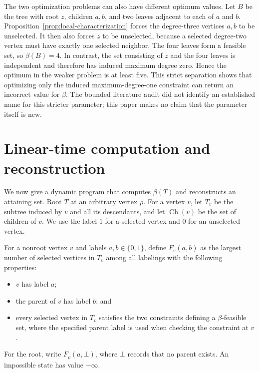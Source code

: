 \documentclass[preprint,12pt]{elsarticle}
\providecommand{\tightlist}{%
  \setlength{\itemsep}{0pt}\setlength{\parskip}{0pt}}
\numberwithin{equation}{section}
\begin{document}
The two optimization problems can also have different optimum values.
Let \(B\) be the tree with root \(z\), children \(a,b\), and two leaves
adjacent to each of \(a\) and \(b\). Proposition~\ref{prop:local-characterization}
forces the degree-three vertices \(a,b\) to be unselected. It then also
forces \(z\) to be unselected, because a selected degree-two vertex must have
exactly one selected neighbor. The four leaves form a feasible set, so
\(\beta(B)=4\). In contrast, the set consisting of \(z\) and the four leaves
is independent and therefore has induced maximum degree zero. Hence the
optimum in the weaker problem is at least five. This strict separation shows
that optimizing only the induced maximum-degree-one constraint can return an
incorrect value for \(\beta\). The
bounded literature audit did not identify an established name for this
stricter parameter; this paper makes no claim that the parameter itself
is new.

\section{Linear-time computation and reconstruction}\label{sec:algorithm}

We now give a dynamic program that computes \(\beta(T)\) and
reconstructs an attaining set. Root \(T\) at an arbitrary vertex
\(\rho\). For a vertex \(v\), let \(T_v\) be the subtree induced by
\(v\) and all its descendants, and let \(\operatorname{Ch}(v)\) be the
set of children of \(v\). We use the label \(1\) for a selected vertex
and \(0\) for an unselected vertex.

For a nonroot vertex \(v\) and labels \(a,b\in\{0,1\}\), define
\(F_v(a,b)\) as the largest number of selected vertices in \(T_v\) among
all labelings with the following properties:

\begin{itemize}
\tightlist
\item
  \(v\) has label \(a\);
\item
  the parent of \(v\) has label \(b\); and
\item
  every selected vertex in \(T_v\) satisfies the two constraints
  defining a \(\beta\)-feasible set, where the specified parent label is
  used when checking the constraint at \(v\).
\end{itemize}

For the root, write \(F_\rho(a,\bot)\), where \(\bot\) records that no
parent exists. An impossible state has value \(-\infty\).
\end{document}
